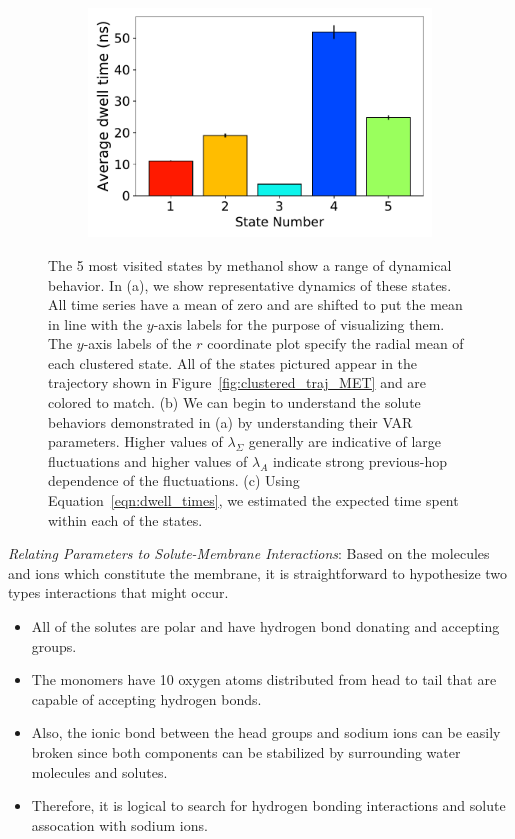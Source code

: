 \documentclass[journal=jpcbfk,manuscript=article]{achemso}
\begin{document}
\begin{figure}
\begin{subfigure}{0.41\textwidth}
  \includegraphics[width=\textwidth]{dwell_times.pdf}
  \caption{}\label{fig:dwell_times}
  \end{subfigure}
  \caption{The 5 most visited states by methanol show a range of dynamical behavior. In 
  (a), we show representative dynamics of these states. All time series have a mean of zero and are
  shifted to put the mean in line with the $y$-axis labels for the purpose of visualizing them.
  The $y$-axis labels of the $r$ coordinate plot specify the radial mean of each clustered 
  state. All of the states pictured appear in the trajectory shown in 
  Figure~\ref{fig:clustered_traj_MET} and are colored to match.
  (b) We can begin to understand the solute behaviors demonstrated in (a) by understanding their VAR 
  parameters. Higher values of $\lambda_{\Sigma}$ generally are indicative of large fluctuations
  and higher values of $\lambda_A$ indicate strong previous-hop dependence of the fluctuations.
  (c) Using Equation~\ref{eqn:dwell_times}, we estimated the expected time spent within each 
  of the states.
  }\label{fig:common_states_MET}
  \end{figure}
   
  \textit{Relating Parameters to Solute-Membrane Interactions}: Based on the
  molecules and ions which constitute the membrane, it is straightforward to 
  hypothesize two types interactions that might occur.
  \begin{itemize}  
    \item All of the solutes are polar and have hydrogen bond donating and 
    accepting groups. 
    \item The monomers have 10 oxygen atoms distributed from head to tail that are 
    capable of accepting hydrogen bonds. 
    \item Also, the ionic bond between the head groups and sodium ions can
    be easily broken since both components can be stabilized by surrounding 
    water molecules and solutes.
    \item Therefore, it is logical to search for hydrogen bonding interactions
    and solute assocation with sodium ions.
  \end{itemize}
  
\end{document}
